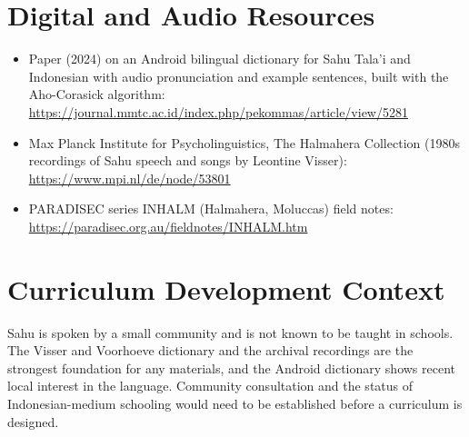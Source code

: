 \documentclass[12pt]{article}
\begin{document}
\section{Digital and Audio Resources}
\begin{itemize}
\item Paper (2024) on an Android bilingual dictionary for Sahu Tala'i and Indonesian with audio pronunciation and example sentences, built with the Aho-Corasick algorithm: \url{https://journal.mmtc.ac.id/index.php/pekommas/article/view/5281}
\item Max Planck Institute for Psycholinguistics, The Halmahera Collection (1980s recordings of Sahu speech and songs by Leontine Visser): \url{https://www.mpi.nl/de/node/53801}
\item PARADISEC series INHALM (Halmahera, Moluccas) field notes: \url{https://paradisec.org.au/fieldnotes/INHALM.htm}
\end{itemize}

\section{Curriculum Development Context}
Sahu is spoken by a small community and is not known to be taught in schools. The Visser and Voorhoeve dictionary and the archival recordings are the strongest foundation for any materials, and the Android dictionary shows recent local interest in the language. Community consultation and the status of Indonesian-medium schooling would need to be established before a curriculum is designed.
\end{document}
